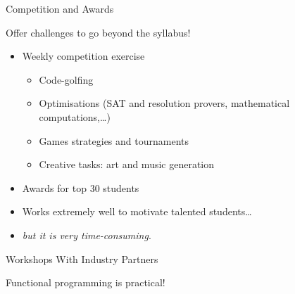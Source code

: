 \documentclass{beamer}
\begin{document}
\begin{frame}[fragile]{Competition and Awards}
\centerline{\Large{\alert{Offer challenges to go beyond the syllabus!}}}
\pause
\begin{itemize}[<+->]
\item Weekly competition exercise
\begin{itemize}
  \item Code-golfing
  \item Optimisations (SAT and resolution provers, mathematical computations,\dots)
  \item Games strategies and tournaments
  \item Creative tasks: art and music generation
\end{itemize}
\item Awards for top 30 students
\item Works extremely well to motivate talented students\dots
\item[] \emph{but it is very time-consuming}.
\end{itemize}
\end{frame}

\begin{frame}{Workshops With Industry Partners}
\vspace{\baselineskip}

\centerline{\Large{\alert{Functional programming is practical!}}}
\begin{itemize}
\end{itemize}
\end{frame}
\end{document}
